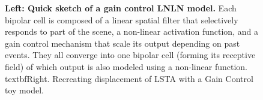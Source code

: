 \begin{figure}
\begin{subfigure}{.5\textwidth}
        \label{fig:ToyModel}
    \end{subfigure}
    \caption{\textbf{Left: Quick sketch of a gain control LNLN model.} Each
        bipolar
        cell is
        composed of a linear spatial filter that selectively responds to part
        of the scene,
        a non-linear activation function, and a gain control mechanism that
        scale its output
        depending on past events. They all converge into one bipolar cell
        (forming its receptive field)
        of which output is also modeled using a non-linear function.
        textbf{Right.} Recreating displacement of LSTA with a Gain
        Control toy model.}
\end{figure}

\clearpage